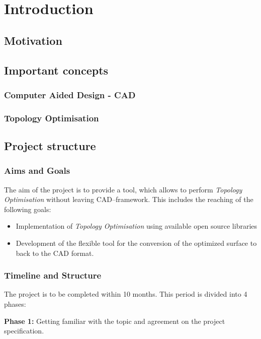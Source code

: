 \chapter{Introduction}
\label{chapter:Introduction}

\section{Motivation}


\section{Important concepts}

\subsection{Computer Aided Design - CAD}

\subsection{Topology Optimisation}

\section{Project structure}
\subsection{Aims and Goals}
The aim of the project is to provide a tool, which allows to perform \textit{Topology Optimisation} without leaving CAD--framework. This includes the reaching of the following goals:
\begin{itemize}
\item Implementation of \textit{Topology Optimisation} using available open source libraries
\item Development of the flexible tool for the conversion of the optimized surface to back to the CAD format.
\end{itemize}
\subsection{Timeline and Structure}
The project is to be completed within 10 months. This period is divided into 4 phases:

\textbf{Phase 1:} Getting familiar with the topic and agreement on the project specification.

\textbf{Phase 2:} Implementation of the first part of the pipeline (Topology Optimisation from CAD surface using existing tools), investigating the tools and algorithms available for the conversion of the geometry generated after topology optimisation back to CAD format (later referred as \textit{NURBS fitting pipeline}), prototyping (using MATLAB) and evaluating of found solutions.

